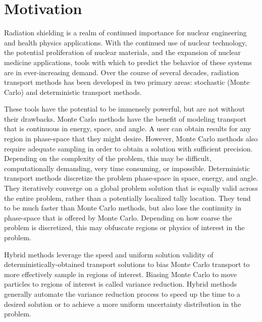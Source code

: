 \section{Motivation}
\label{sec:motivation}

Radiation shielding is a realm of continued importance for nuclear engineering
and health physics applications. With the continued use of nuclear technology,
the potential proliferation of nuclear materials, and the expansion of
nuclear medicine applications, tools with which to predict the behavior
of these systems are
in ever-increasing demand. Over the course of several decades, radiation
transport methods has been developed in two primary areas: stochastic (Monte
Carlo) and
deterministic transport methods.

These tools have the potential to be immensely
powerful, but are not without their drawbacks. Monte Carlo methods have the
benefit of modeling transport that is continuous in energy, space, and angle.
A user can obtain results for any region in phase-space that they might desire.
However, Monte Carlo methods also require adequate sampling in order to obtain a
solution with sufficient precision. Depending on the complexity of the problem,
this may be difficult, computationally demanding, very time consuming,
or impossible. Deterministic
transport methods discretize the problem phase-space in space, energy, and
angle. They iteratively converge on a global problem solution that is equally
valid across the entire problem, rather than a potentially localized tally
location. They tend to be much faster than Monte Carlo methods, but also lose
the continuity in phase-space that is offered by Monte Carlo. Depending on how
coarse the problem is discretized, this may obfuscate regions or physics of
interest in the problem.

Hybrid methods leverage the speed and uniform solution validity of
deterministically-obtained transport solutions to bias Monte Carlo transport to
more effectively sample in regions of interest. Biasing Monte Carlo to move
particles to regions of interest is called variance reduction. Hybrid methods
generally automate the variance reduction process to speed up the time to a
desired solution or to achieve a more uniform uncertainty distribution in the
problem.
